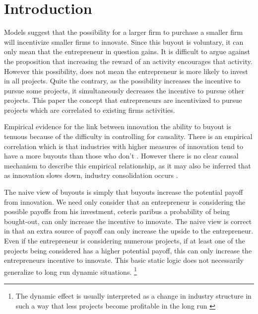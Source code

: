 \section{Introduction}

Models suggest that the possibility for a larger firm to purchase a smaller firm will incentivize smaller firms to innovate. Since this buyout is voluntary, it can only mean that the entrepreneur in question gains. It is difficult to argue against the proposition that increasing the reward of an activity encourages that activity. However this possibility, does not mean the entrepreneur is more likely to invest in all projects. Quite the contrary, as the possibility increases the incentive to pursue some projects, it simultaneously decreases the incentive to pursue other projects. This paper the concept that entrepreneurs are incentivized to pursue projects which are correlated to existing firms activities.


Empirical evidence for the link between innovation the ability to buyout is tenuous because of the difficulty in controlling for causality. There is an empirical correlation which is that industries with higher measures of innovation tend to have a more buyouts than those who don't \citep{HAU}. However there is no clear causal mechanism to describe this empirical relationship, as it may also be inferred that as innovation slows down, industry consolidation occurs \citep{COM}. 

The naive view of buyouts is simply that buyouts increase the potential payoff from innovation. We need only consider that an entrepreneur is considering the possible payoffs from his investment, ceteris paribus a probability of being bought-out, can only increase the incentive to innovate. The naive view is correct in that an extra source of payoff can only increase the upside to the entrepreneur. Even if the entrepreneur is considering numerous projects, if at least one of the projects being considered has a higher potential payoff, this can only increase the entrepreneurs incentive to innovate. This basic static logic does not necessarily generalize to long run dynamic situations. \footnote{The dynamic effect is usually interpreted as a change in industry structure in such a way that less projects become profitable in the long run \cite{bessen_maskin}}

